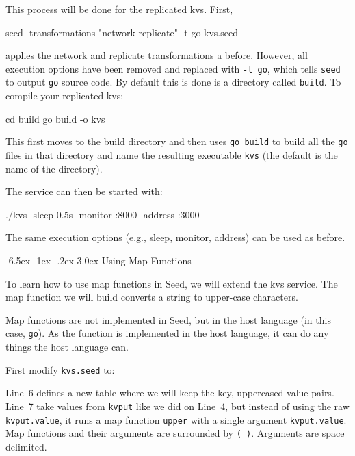 \documentclass[a5paper,12pt,onecolumn]{article}
\makeatletter
\def\code#1{\mbox{\lstinline{#1}}}
\renewcommand\section{\@startsection {section}{1}{\z@}%
	{-6.5ex \@plus -1ex \@minus -.2ex}%
	{3.0ex}%
	{\sf\Large}}
\makeatother
\begin{document}
This process will be done for the replicated kvs. First,

\begin{cli}
seed -transformations "network replicate" -t go kvs.seed
\end{cli}

applies the network and replicate transformations a before. However, all execution options have been removed and replaced with \code{-t go}, which tells \code{seed} to output \code{go} source code. By default this is done is a directory called \code{build}. To compile your replicated kvs:

\begin{cli}
cd build
go build -o kvs
\end{cli}

This first moves to the build directory and then uses \code{go build} to build all the \code{go} files in that directory and name the resulting executable \code{kvs} (the default is the name of the directory).

The service can then be started with:

\begin{cli}
./kvs -sleep 0.5s -monitor :8000 -address :3000
\end{cli}

The same execution options (e.g., sleep, monitor, address) can be used as before.

\section{Using Map Functions}

To learn how to use map functions in Seed, we will extend the kvs service. The map function we will build converts a string to upper-case characters.

Map functions are not implemented in Seed, but in the host language (in this case, \code{go}). As the function is implemented in the host language, it can do any things the host language can.

First modify \code{kvs.seed} to:



Line~6 defines a new table where we will keep the key, uppercased-value pairs. Line~7 take values from \code{kvput} like we did on Line~4, but instead of using the raw \code{kvput.value}, it runs a map function \code{upper} with a single argument \code{kvput.value}. Map functions and their arguments are surrounded by \code{( )}. Arguments are space delimited.
\end{document}
